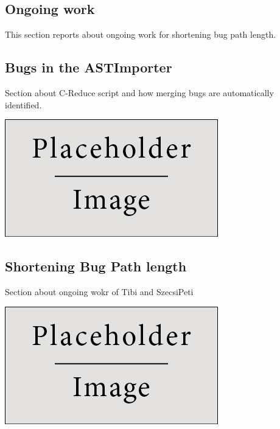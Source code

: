 \documentclass[a0,portrait]{a0poster}
\begin{document}
\begin{multicols}{2}
\section*{Ongoing work}

This section reports about ongoing work for shortening bug path length. 


\subsection*{Bugs in the ASTImporter}

Section about C-Reduce script and how merging bugs are automatically identified.
\begin{center}\vspace{1cm}
\includegraphics[width=0.8\linewidth]{placeholder}
\end{center}\vspace{1cm}


\subsection*{Shortening Bug Path length}

Section about ongoing wokr of Tibi and SzecsiPeti 

\begin{center}\vspace{1cm}
\includegraphics[width=0.8\linewidth]{placeholder}
\end{center}\vspace{1cm}


\end{multicols}
\end{document}
